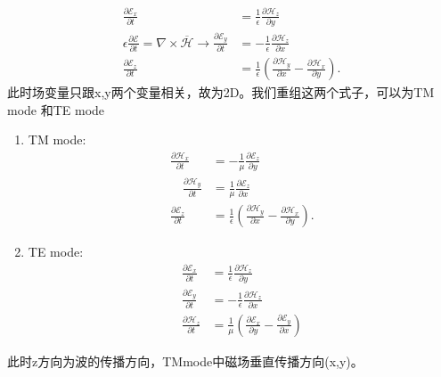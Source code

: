 \documentclass{article}
\begin{document}
\begin{CJK*}{UTF8}{gbsn}
\[   \begin{aligned}
     \frac{\partial \mathscr{E}_x}{\partial t} & = \frac{1}{\epsilon} 
     \frac{\partial \mathscr{H}_z}{\partial y}\\
     \epsilon \frac{\partial \mathscr{E}}{\partial t} = \nabla \times
     \overline{\mathscr{H}} \rightarrow \frac{\partial \mathscr{E}_y}{\partial
     t} & = - \frac{1}{\epsilon}  \frac{\partial \mathscr{H}_z}{\partial x}\\
     \frac{\partial \mathscr{E}_z}{\partial t} & = \frac{1}{\epsilon}  \left(
     \frac{\partial \mathscr{H}_y}{\partial x} - \frac{\partial
     \mathscr{H}_x}{\partial y} \right) .
   \end{aligned} \]
此时场变量只跟x,y两个变量相关，故为2D。我们重组这两个式子，可以为TM
mode 和TE mode
\begin{enumerate}
  \item TM mode:
  \[ \begin{array}{ll}
       \frac{\partial \mathscr{H}_x}{\partial t} & = - \frac{1}{\mu} 
       \frac{\partial \mathscr{E}_z}{\partial y}\\
       \quad \frac{\partial \mathcal{H}_y}{\partial t} & = \frac{1}{\mu} 
       \frac{\partial \mathscr{E}_z}{\partial x}\\
       \frac{\partial \mathscr{E}_z}{\partial t} & = \frac{1}{\epsilon} 
       \left( \frac{\partial \mathscr{H}_y}{\partial x} - \frac{\partial
       \mathscr{H}_x}{\partial y} \right) .
     \end{array} \]
  \item TE mode:
  \[ \begin{array}{ll}
       \frac{\partial \mathscr{E}_x}{\partial t} & = \frac{1}{\epsilon} 
       \frac{\partial \mathscr{H}_z}{\partial y}\\
       \frac{\partial \mathscr{E}_y}{\partial t} & = - \frac{1}{\epsilon} 
       \frac{\partial \mathscr{H}_z}{\partial x}\\
       \frac{\partial \mathscr{H}_z}{\partial t} & = \frac{1}{\mu}  \left(
       \frac{\partial \mathscr{E}_x}{\partial y} - \frac{\partial
       \mathscr{E}_y}{\partial x} \right)
     \end{array} \]
\end{enumerate}
此时z方向为波的传播方向，TMmode中磁场垂直传播方向(x,y)。



\end{CJK*}
\end{document}
